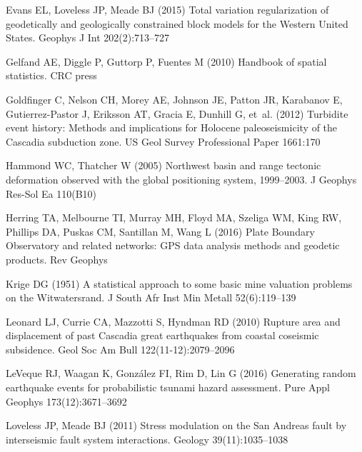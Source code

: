 {\begin{thebibliography}{33}
Evans EL, Loveless JP, Meade BJ (2015) Total variation regularization of
  geodetically and geologically constrained block models for the {W}estern
  {U}nited {S}tates. Geophys J Int 202(2):713--727

Gelfand AE, Diggle P, Guttorp P, Fuentes M (2010) Handbook of spatial
  statistics. CRC press

Goldfinger C, Nelson CH, Morey AE, Johnson JE, Patton JR, Karabanov E,
  Gutierrez-Pastor J, Eriksson AT, Gracia E, Dunhill G, et~al. (2012) Turbidite
  event history: Methods and implications for {H}olocene paleoseismicity of the
  {C}ascadia subduction zone. {US} Geol Survey Professional Paper 1661:170

Hammond WC, Thatcher W (2005) Northwest basin and range tectonic deformation
  observed with the global positioning system, 1999--2003. J Geophys Res-Sol Ea
  110(B10)

Herring TA, Melbourne TI, Murray MH, Floyd MA, Szeliga WM, King RW, Phillips
  DA, Puskas CM, Santillan M, Wang L (2016) Plate {B}oundary {O}bservatory and
  related networks: {GPS} data analysis methods and geodetic products. Rev
  Geophys

Krige DG (1951) A statistical approach to some basic mine valuation problems on
  the {W}itwatersrand. J South Afr Inst Min Metall 52(6):119--139

Leonard LJ, Currie CA, Mazzotti S, Hyndman RD (2010) Rupture area and
  displacement of past {C}ascadia great earthquakes from coastal coseismic
  subsidence. Geol Soc Am Bull 122(11-12):2079--2096

LeVeque RJ, Waagan K, Gonz{\'a}lez FI, Rim D, Lin G (2016) Generating random
  earthquake events for probabilistic tsunami hazard assessment. Pure Appl
  Geophys 173(12):3671--3692

Loveless JP, Meade BJ (2011) Stress modulation on the {S}an {A}ndreas fault by
  interseismic fault system interactions. Geology 39(11):1035--1038


\end{thebibliography}}

